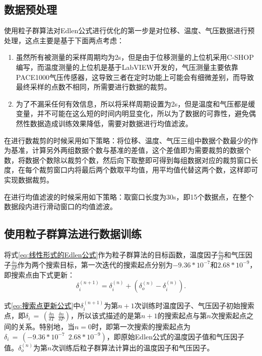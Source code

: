 \subsection{数据预处理}
使用粒子群算法对Edlen公式进行优化的第一步是对位移、温度、气压数据进行预处理，这点主要是基于下面两点考虑：
\begin{enumerate}
  \item 虽然所有被测量的采样周期均为2s，但是由于位移测量的上位机采用C-SHOP编写，而温度测量的上位机是基于LabVIEW开发的，气压测量主要依靠PACE1000气压传感器，这导致三者在定时功能上可能会有细微差别，而导致最终采样的点数不相同，所需要进行数据的裁剪。
  \item 为了不漏采任何有效信息，所以将采样周期设置为2s，但是温度和气压都是缓变量，并不可能在这么短的时间内明显变化，所以为了数据的可靠性，避免偶然性数据造成训练效果降低，需要对数据进行均值滤波。
\end{enumerate}

在进行数裁剪的时候采用如下策略：将位移、温度、气压三组中数据个数最少的作为基准，计算另外两组数据个数与基准的差值，这个差值即为需要裁剪的数据个数，将数据个数除以裁剪个数，然后向下取整即可得到每组数据对应的裁剪窗口长度，在每个裁剪窗口内将最后两个数取平均值，用平均值代替这两个数，这样即可实现数据裁剪。

在进行均值滤波的时候采用如下策略：取窗口长度为30s，即15个数据点，在整个数据段内进行滑动窗口的均值滤波。

\subsection{使用粒子群算法进行数据训练}
将式\eqref{eq:线性形式的Edlen公式}作为粒子群算法的目标函数，温度因子$\frac{\delta n}{\delta T}$和气压因子$\frac{\delta n}{\delta P}$作为两个搜索目标，第一次迭代的搜索起点分别为$-9.36*10^{-7}$和$2.68*10^{-9}$，即搜索点由下式更新：
\begin{equation}\label{eq:搜索点更新公式}
  \delta^{(n+1)}_i = \delta^{(n)}_i+(\delta^{(n)}_o-\delta^{(n)}_i).
  \end{equation}

式\eqref{eq:搜索点更新公式}中$\delta^{(n+1)}_i$为第$n+1$次训练时温度因子、气压因子初始搜索点，即$\delta_i\,=\,(\frac{\delta n}{\delta T}\,\,\,\frac{\delta n}{\delta P})$，所以该式描述的是第$n+1$的搜索起点与第$n$次搜索起点之间的关系。特别地，当$n=0$时，即第一次搜索的搜索起点为$\delta_i\,=\,(-9.36*10^{-7}\,\,\,2.68*10^{-9})$，即原始Edlen公式的温度因子值和气压因子值。$\delta_o^{(n)}$为第$n$次训练后粒子群算法计算出的温度因子和气压因子。

